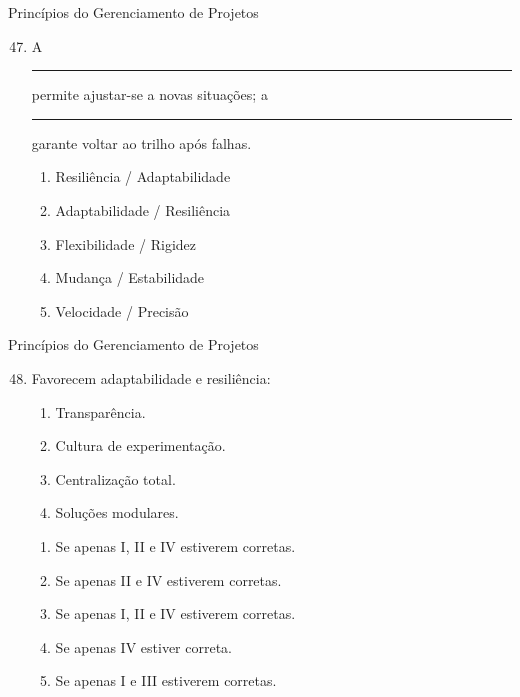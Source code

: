 \documentclass{beamer}
\begin{document}
\begin{frame}{Princípios do Gerenciamento de Projetos}
	\begin{enumerate}
		\setcounter{enumi}{46}
		\justifying
		\item A \rule{50pt}{0.75pt} permite ajustar-se a novas situações; a \rule{50pt}{0.75pt} garante voltar ao trilho após falhas.
		\begin{enumerate}[a]
			\item Resiliência / Adaptabilidade
			\item \alert<2>{Adaptabilidade / Resiliência}
			\item Flexibilidade / Rigidez
			\item Mudança / Estabilidade
			\item Velocidade / Precisão
		\end{enumerate}
	\end{enumerate}
\end{frame}

\begin{frame}{Princípios do Gerenciamento de Projetos}
	\begin{enumerate}
		\setcounter{enumi}{47}
		\justifying
		\item Favorecem adaptabilidade e resiliência:
		\begin{enumerate}[I]
			\item Transparência.
			\item Cultura de experimentação.
			\item Centralização total.
			\item Soluções modulares.
		\end{enumerate}
		\begin{enumerate}[a]
			\item Se apenas I, II e IV estiverem corretas.
			\item Se apenas II e IV estiverem corretas.
			\item \alert<2>{Se apenas I, II e IV estiverem corretas.}
			\item Se apenas IV estiver correta.
			\item Se apenas I e III estiverem corretas.
		\end{enumerate}
	\end{enumerate}
\end{frame}
\end{document}
